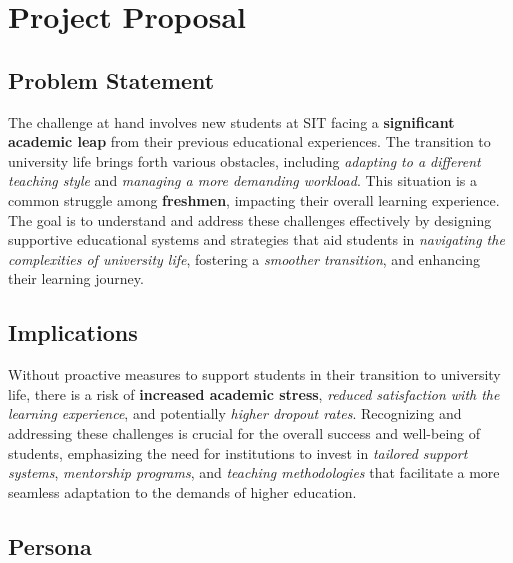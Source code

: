 
\section*{Project Proposal}\label{project_proposal}

 \subsection{Problem Statement}\label{problem_statement}
The challenge at hand involves new students at SIT facing a \textbf{significant academic leap} from their previous educational experiences. The transition to university life brings forth various obstacles, including \textit{adapting to a different teaching style} and \textit{managing a more demanding workload}. This situation is a common struggle among \textbf{freshmen}, impacting their overall learning experience. The goal is to understand and address these challenges effectively by designing supportive educational systems and strategies that aid students in \textit{navigating the complexities of university life}, fostering a \textit{smoother transition}, and enhancing their learning journey.

\subsection{Implications}\label{implications}
Without proactive measures to support students in their transition to university life, there is a risk of \textbf{increased academic stress}, \textit{reduced satisfaction with the learning experience}, and potentially \textit{higher dropout rates}. Recognizing and addressing these challenges is crucial for the overall success and well-being of students, emphasizing the need for institutions to invest in \textit{tailored support systems}, \textit{mentorship programs}, and \textit{teaching methodologies} that facilitate a more seamless adaptation to the demands of higher education.
 
\subsection{Persona}\label{persona}


